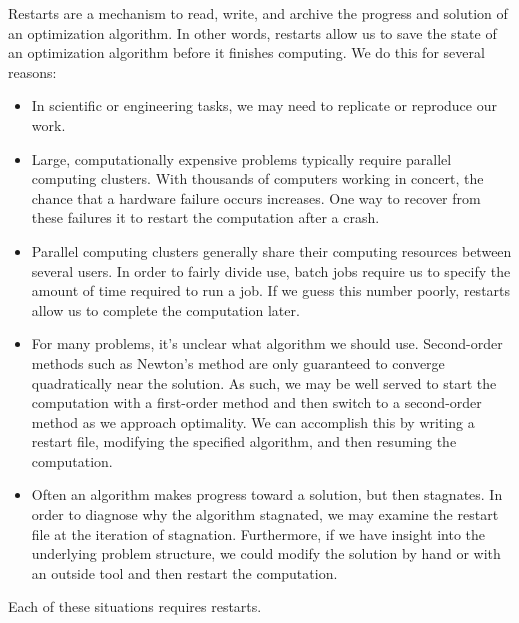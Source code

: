 \documentclass{report}
\begin{document}
        Restarts are a mechanism to read, write, and archive the progress and solution of an optimization algorithm.  In other words, restarts allow us to save the state of an optimization algorithm before it finishes computing.  We do this for several reasons:
\begin{itemize}
    \item In scientific or engineering tasks, we may need to replicate or reproduce our work.

    \item Large, computationally expensive problems typically require parallel computing clusters.  With thousands of computers working in concert, the chance that a hardware failure occurs increases.  One way to recover from these failures it to restart the computation after a crash.

    \item Parallel computing clusters generally share their computing resources between several users.  In order to fairly divide use, batch jobs require us to specify the amount of time required to run a job.  If we guess this number poorly, restarts allow us to complete the computation later.

    \item For many problems, it's unclear what algorithm we should use.  Second-order methods such as Newton's method are only guaranteed to converge quadratically near the solution.  As such, we may be well served to start the computation with a first-order method and then switch to a second-order method as we approach optimality.  We can accomplish this by writing a restart file, modifying the specified algorithm, and then resuming the computation.

    \item Often an algorithm makes progress toward a solution, but then stagnates.  In order to diagnose why the algorithm stagnated, we may examine the restart file at the iteration of stagnation.  Furthermore, if we have insight into the underlying problem structure, we could modify the solution by hand or with an outside tool and then restart the computation.
\end{itemize}
\noindent Each of these situations requires restarts.
\end{document}

